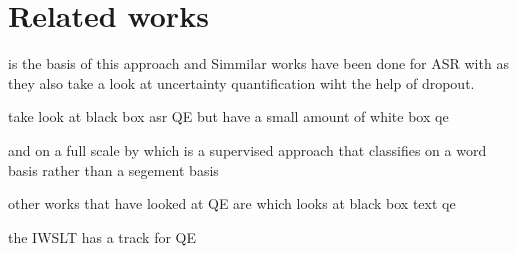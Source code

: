 
\chapter{Related works}
\label{ch:relatecworks}
\cite{fomicheva2020unsupervised} is the basis of this approach and 
Simmilar works have been done for ASR with \cite{8683086} as they also take a look at uncertainty quantification wiht the help of dropout. 

\cite{negri-etal-2014-quality} take look at black box asr QE but have a small amount of white box qe

and on a full scale by 
\cite{le2016automatic} which is a supervised approach that classifies on a word basis rather than a segement basis

other works that have looked at QE are \cite{dinh2023perturbationbasedqeexplainableunsupervised} which looks at black box text qe

the IWSLT has a track for QE 
